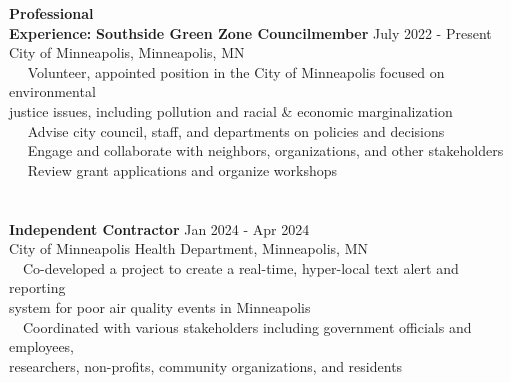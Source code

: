 \documentclass[letterpaper,12pt]{article}
\numberwithin{equation}{section}
\begin{document}
\noindent\textbf{Professional}\\
\noindent\textbf{Experience:} \hspace*{.16in} \textbf{Southside Green Zone Councilmember} \hspace*{1.68in} July 2022 - Present\\
\hspace*{1.2in} City of Minneapolis, Minneapolis, MN \vspace*{.1cm}\\
\hspace*{1.2in} \textbullet ~~ Volunteer, appointed position in the City of Minneapolis focused on environmental\\
\hspace*{1.6in} justice issues, including pollution and racial \& economic marginalization\\
\hspace*{1.2in} \textbullet ~~ Advise city council, staff, and departments on policies and decisions\\
\hspace*{1.2in} \textbullet ~~ Engage and collaborate with neighbors, organizations, and other stakeholders\\
\hspace*{1.2in} \textbullet ~~ Review grant applications and organize workshops\\
\\\\
\hspace*{1.16in}\textbf{Independent Contractor} \hspace*{2.8in} Jan 2024 - Apr 2024\\
\hspace*{1.2in} City of Minneapolis Health Department, Minneapolis, MN \vspace*{.1cm} \\
\hspace*{1.2in} \textbullet ~~Co-developed a project to create a real-time, hyper-local text alert and reporting\\
\hspace*{1.6in} system for poor air quality events in Minneapolis
\\
\hspace*{1.2in} \textbullet ~~Coordinated with various stakeholders including government officials and employees, \\
\hspace*{1.6in} researchers, non-profits, community organizations, and residents \\
\end{document}
